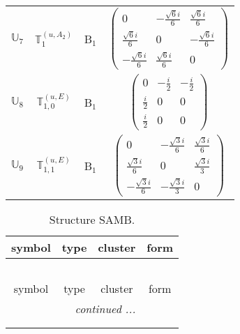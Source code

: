 \documentclass[fleqn,10pt,landscape]{article}
\begin{document}
\begin{itemize}
\begin{center}
\begin{longtable}{c|c|c|c}
$ \mathbb{U}_{7} $ & $\mathbb{T}_{1}^{(u,A_{2})}$ & B$_{1}$ & $\begin{pmatrix} 0 & - \frac{\sqrt{6} i}{6} & \frac{\sqrt{6} i}{6} \\ \frac{\sqrt{6} i}{6} & 0 & - \frac{\sqrt{6} i}{6} \\ - \frac{\sqrt{6} i}{6} & \frac{\sqrt{6} i}{6} & 0 \end{pmatrix}$ \\
$ \mathbb{U}_{8} $ & $\mathbb{T}_{1,0}^{(u,E)}$ & B$_{1}$ & $\begin{pmatrix} 0 & - \frac{i}{2} & - \frac{i}{2} \\ \frac{i}{2} & 0 & 0 \\ \frac{i}{2} & 0 & 0 \end{pmatrix}$ \\
$ \mathbb{U}_{9} $ & $\mathbb{T}_{1,1}^{(u,E)}$ & B$_{1}$ & $\begin{pmatrix} 0 & - \frac{\sqrt{3} i}{6} & \frac{\sqrt{3} i}{6} \\ \frac{\sqrt{3} i}{6} & 0 & \frac{\sqrt{3} i}{3} \\ - \frac{\sqrt{3} i}{6} & - \frac{\sqrt{3} i}{3} & 0 \end{pmatrix}$ \\
\end{longtable}
\end{center}
\begin{center}
\renewcommand{\arraystretch}{1.3}
\begin{longtable}{c|c|c|c}
\caption{Structure SAMB.}
 \\
 \hline \hline
symbol & type & cluster & form \\ \hline \endfirsthead

\multicolumn{3}{l}{\tablename\ \thetable{}} \\
 \hline \hline
symbol & type & cluster & form \\ \hline \endhead

 \hline \hline
\multicolumn{3}{r}{\footnotesize\it continued ...} \\ \endfoot

 \hline \hline
\multicolumn{3}{r}{} \\ \endlastfoot


\end{longtable}
\end{center}
\end{itemize}
\end{document}
